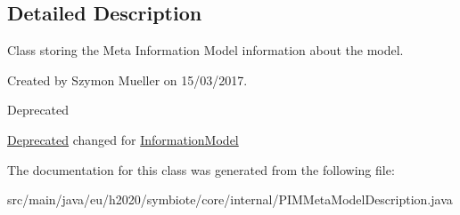 \subsection{Detailed Description}
Class storing the Meta Information Model information about the model.

Created by Szymon Mueller on 15/03/2017.

\begin{DoxyRefDesc}{Deprecated}
\item[\hyperlink{deprecated__deprecated000003}{Deprecated}]changed for \hyperlink{}{Information\+Model} \end{DoxyRefDesc}


The documentation for this class was generated from the following file\+:\begin{DoxyCompactItemize}
\item 
src/main/java/eu/h2020/symbiote/core/internal/P\+I\+M\+Meta\+Model\+Description.\+java\end{DoxyCompactItemize}

